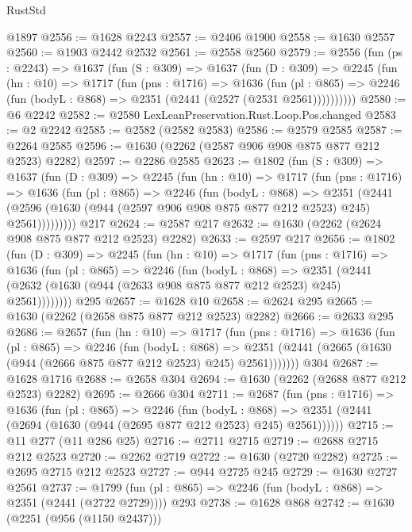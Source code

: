 \begin{lexlean}{RustStd}
\begin{coremodule}
    @1897
@2556 := @1628 @2243
@2557 := @2406 @1900
@2558 := @1630 @2557
@2560 := @1903 @2442 @2532
@2561 := @2558 @2560
@2579 := @2556
    (fun (ps : @2243) =>
    @1637
      (fun (S : @309) =>
      @1637
        (fun (D : @309) =>
        @2245
          (fun (hn : @10) =>
          @1717
            (fun (pns : @1716) =>
            @1636
              (fun (pl : @865) =>
              @2246 (fun (bodyL : @868) => @2351 (@2441 (@2527 (@2531 @2561))))))))))
@2580 := @6 @2242
@2582 := @2580 LexLeanPreservation.Rust.Loop.Pos.changed
@2583 := @2 @2242
@2585 := @2582 (@2582 @2583)
@2586 := @2579 @2585
@2587 := @2264 @2585
@2596 := @1630 (@2262 (@2587 @906 @908 @875 @877 @212 @2523) @2282)
@2597 := @2286 @2585
@2623 := @1802
    (fun (S : @309) =>
    @1637
      (fun (D : @309) =>
      @2245
        (fun (hn : @10) =>
        @1717
          (fun (pns : @1716) =>
          @1636
            (fun (pl : @865) =>
            @2246
              (fun (bodyL : @868) =>
              @2351
                (@2441
                  (@2596 (@1630 (@944 (@2597 @906 @908 @875 @877 @212 @2523) @245) @2561)))))))))
    @217
@2624 := @2587 @217
@2632 := @1630 (@2262 (@2624 @908 @875 @877 @212 @2523) @2282)
@2633 := @2597 @217
@2656 := @1802
    (fun (D : @309) =>
    @2245
      (fun (hn : @10) =>
      @1717
        (fun (pns : @1716) =>
        @1636
          (fun (pl : @865) =>
          @2246
            (fun (bodyL : @868) =>
            @2351 (@2441 (@2632 (@1630 (@944 (@2633 @908 @875 @877 @212 @2523) @245) @2561))))))))
    @295
@2657 := @1628 @10
@2658 := @2624 @295
@2665 := @1630 (@2262 (@2658 @875 @877 @212 @2523) @2282)
@2666 := @2633 @295
@2686 := @2657
    (fun (hn : @10) =>
    @1717
      (fun (pns : @1716) =>
      @1636
        (fun (pl : @865) =>
        @2246
          (fun (bodyL : @868) =>
          @2351 (@2441 (@2665 (@1630 (@944 (@2666 @875 @877 @212 @2523) @245) @2561)))))))
    @304
@2687 := @1628 @1716
@2688 := @2658 @304
@2694 := @1630 (@2262 (@2688 @877 @212 @2523) @2282)
@2695 := @2666 @304
@2711 := @2687
    (fun (pns : @1716) =>
    @1636
      (fun (pl : @865) =>
      @2246
        (fun (bodyL : @868) =>
        @2351 (@2441 (@2694 (@1630 (@944 (@2695 @877 @212 @2523) @245) @2561))))))
@2715 := @11 @277 (@11 @286 @25)
@2716 := @2711 @2715
@2719 := @2688 @2715 @212 @2523
@2720 := @2262 @2719
@2722 := @1630 (@2720 @2282)
@2725 := @2695 @2715 @212 @2523
@2727 := @944 @2725 @245
@2729 := @1630 @2727 @2561
@2737 := @1799 (fun (pl : @865) => @2246 (fun (bodyL : @868) => @2351 (@2441 (@2722 @2729)))) @293
@2738 := @1628 @868
@2742 := @1630 (@2251 (@956 (@1150 @2437)))

\end{coremodule}
\end{lexlean}
